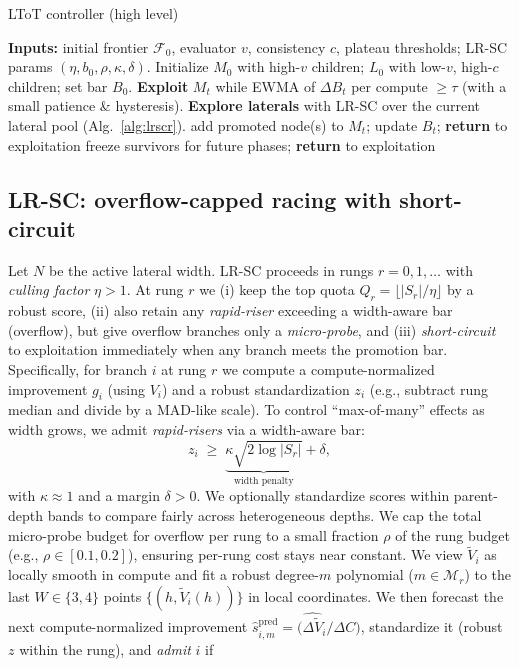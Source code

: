 \documentclass{article}
\begin{document}
\begin{algorithm*}[t]
\caption{LToT controller (high level)}
\label{alg:ltot-controller}
\begin{algorithmic}[1]
\State \textbf{Inputs:} initial frontier $\mathcal{F}_0$, evaluator $v$, consistency $c$, plateau thresholds; LR-SC params $(\eta,b_0,\rho, \kappa,\delta)$.
\State Initialize $M_0$ with high-$v$ children; $L_0$ with low-$v$, high-$c$ children; set bar $B_0$.
  \State \textbf{Exploit} $M_t$ while EWMA of $\Delta B_t$ per compute $\ge \tau$ (with a small patience \& hysteresis).
  \State \textbf{Explore laterals} with LR-SC over the current lateral pool (Alg.~\ref{alg:lrscr}). \label{line:lrscr}
     \State add promoted node(s) to $M_t$; update $B_t$; \textbf{return} to exploitation
  \Else
     \State freeze survivors for future phases; \textbf{return} to exploitation
  \EndIf
\EndWhile
\end{algorithmic}
\end{algorithm*}\vspace{-0.5em}

\subsection{LR-SC: overflow-capped racing with short-circuit}\label{sec:lrscr} Let $N$ be the active lateral width. LR-SC proceeds in rungs $r=0,1,\dots$ with \emph{culling factor} $\eta>1$. At rung $r$ we (i) keep the top quota $Q_r=\lfloor |S_r|/\eta \rfloor$ by a robust score, (ii) also retain any \emph{rapid-riser} exceeding a width-aware bar (overflow), but give overflow branches only a \emph{micro-probe}, and (iii) \emph{short-circuit} to exploitation immediately when any branch meets the promotion bar. Specifically, for branch $i$ at rung $r$ we compute a compute-normalized improvement $g_i$ (using $V_i$) and a robust standardization $z_i$ (e.g., subtract rung median and divide by a MAD-like scale). To control ``max-of-many'' effects as width grows, we admit \emph{rapid-risers} via a width-aware bar: \[ z_i \;\ge\; \underbrace{\kappa \sqrt{2\log |S_r|}}_{\text{width penalty}} + \delta, \] with $\kappa\approx 1$ and a margin $\delta>0$. We optionally standardize scores within parent-depth bands to compare fairly across heterogeneous depths. We cap the total micro-probe budget for overflow per rung to a small fraction $\rho$ of the rung budget (e.g., $\rho\in[0.1,0.2]$), ensuring per-rung cost stays near constant. We view $\tilde V_i$ as locally smooth in compute and fit a robust degree-$m$ polynomial ($m\!\in\!\mathcal{M}_r$) to the last $W\in\{3,4\}$ points $\{(h,\tilde V_i(h))\}$ in local coordinates. We then forecast the next compute-normalized improvement $\widehat{s}^{\mathrm{pred}}_{i,m}=\big(\widehat{\Delta \tilde V}_i / \Delta C\big)$, standardize it (robust $z$ within the rung), and \emph{admit} $i$ if
\end{document}
